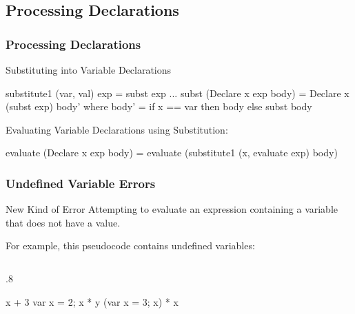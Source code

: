 \documentclass{beamer}
\newenvironment{codeblock}[1][.8]{%
\begin{columns}
\begin{column}{#1\linewidth}
\begin{exampleblock}{}}{%
\end{exampleblock}
\end{column}
\end{columns}}
\begin{document}
\subsection{Processing Declarations}

\begin{frame}[fragile]
\frametitle{Processing Declarations}

\noindent Substituting into Variable Declarations
\begin{hcode}
substitute1 (var, val) exp = subst exp
  ...
  subst (Declare x exp body)  = Declare x (subst exp) body'
    where body' = if x == var
                  then body
                  else subst body
\end{hcode}

\pause
\noindent Evaluating Variable Declarations using Substitution:
\begin{hcode}
evaluate (Declare x exp body) 
     = evaluate (substitute1 (x, evaluate exp) body)
\end{hcode}
\end{frame}



\begin{frame}[fragile]
\frametitle{Undefined Variable Errors}

\begin{block}{New Kind of Error}
Attempting to evaluate an expression containing a variable that does not have a value. 
\end{block}

\noindent For example, this pseudocode contains undefined variables:
\begin{codeblock}
\begin{hcode}
x + 3
var x = 2; x * y
(var x = 3; x) * x
\end{hcode}
\end{codeblock}

\end{frame}
\end{document}
